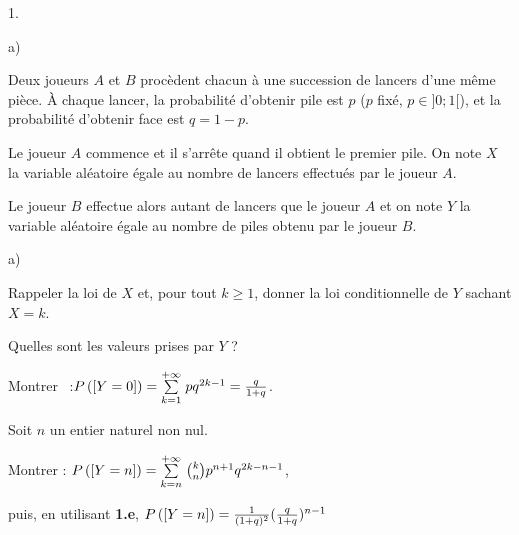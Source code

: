 \documentclass[11pt]{article}%
\begin{document}
\begin{noliste}{1.}
\begin{noliste}{a)}
\end{noliste}

\item Deux joueurs $A$ et $B$ procèdent chacun à une succession de
lancers d'une même pièce. \`{A} chaque lancer, la probabilité
d'obtenir pile est $p$ ($p$ fixé, $p\in]0;1[$), et la probabilité
d'obtenir face est $q = 1-p$.

Le joueur $A$ commence et il s'arrête quand il obtient le premier pile.
On
note $X$ la variable aléatoire égale au nombre de lancers
effectués par le joueur $A$.

Le joueur $B$ effectue alors autant de lancers que le joueur $A$ et on
note
$Y$ la variable aléatoire égale au nombre de piles obtenu par le
joueur $B$.

\begin{noliste}{a)}
 \setlength{\itemsep}{2mm}
\item Rappeler la loi de $X$ et, pour tout $k\geq1$, donner la loi
conditionnelle de $Y$ sachant $X = k$.

\item Quelles sont les valeurs prises par $Y$ ?

\item Montrer~ :\quad$ P\left(\left[ {Y = 0} \right]\right) = {\textstyle\sum\limits_{k = 1}^{+
\infty}}\hspace{.1cm}pq^{2k-1} = {\frac{q}{1 + q}}$.

\item Soit $n$ un entier naturel non nul.

Montrer : \quad$ P\left(\left[ {Y = n} \right]\right) = {\textstyle\sum\limits_{k = n}^{+
\infty}}\hspace{.1cm}\binom{k}{n}p^{n + 1}q^{2k-n-1}$,

puis, en utilisant \textbf{1.e}, $ P\left(\left[ {Y = n} \right]\right) =
{\frac{1}{(1 + q)^{2}}}({\frac{q}{1 + q}})^{n-1}$
\end{noliste}
\end{noliste}
\end{document}
